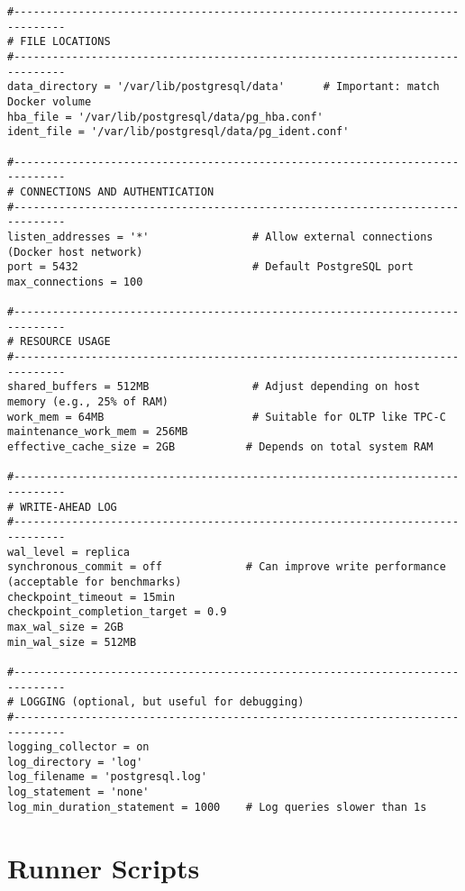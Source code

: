 \begin{lstlisting}[caption={PostgreSQL configuration file}, label={lst:postgresql-config}]
#------------------------------------------------------------------------------
# FILE LOCATIONS
#------------------------------------------------------------------------------
data_directory = '/var/lib/postgresql/data'      # Important: match Docker volume
hba_file = '/var/lib/postgresql/data/pg_hba.conf'
ident_file = '/var/lib/postgresql/data/pg_ident.conf'

#------------------------------------------------------------------------------
# CONNECTIONS AND AUTHENTICATION
#------------------------------------------------------------------------------
listen_addresses = '*'                # Allow external connections (Docker host network)
port = 5432                           # Default PostgreSQL port
max_connections = 100

#------------------------------------------------------------------------------
# RESOURCE USAGE
#------------------------------------------------------------------------------
shared_buffers = 512MB                # Adjust depending on host memory (e.g., 25% of RAM)
work_mem = 64MB                       # Suitable for OLTP like TPC-C
maintenance_work_mem = 256MB
effective_cache_size = 2GB           # Depends on total system RAM

#------------------------------------------------------------------------------
# WRITE-AHEAD LOG
#------------------------------------------------------------------------------
wal_level = replica
synchronous_commit = off             # Can improve write performance (acceptable for benchmarks)
checkpoint_timeout = 15min
checkpoint_completion_target = 0.9
max_wal_size = 2GB
min_wal_size = 512MB

#------------------------------------------------------------------------------
# LOGGING (optional, but useful for debugging)
#------------------------------------------------------------------------------
logging_collector = on
log_directory = 'log'
log_filename = 'postgresql.log'
log_statement = 'none'
log_min_duration_statement = 1000    # Log queries slower than 1s
\end{lstlisting}

\pagebreak

\section{Runner Scripts}
\label{sec:runner-scripts}

